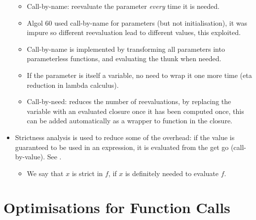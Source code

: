 \begin{itemize}
\begin{itemize}
\item Call-by-name: reevaluate the parameter \emph{every} time it is needed.

\item Algol 60 used call-by-name for parameters (but not initialisation), it
was impure so different reevaluation lead to different values, this exploited.

\item Call-by-name is implemented by transforming all parameters into
parameterless functions, and evaluating the thunk when needed.

\item If the parameter is itself a variable, no need to wrap it one more time
(eta reduction in lambda calculus).

\item Call-by-need: reduces the number of reevaluations, by replacing the
variable with an evaluated closure once it has been computed once, this can be
added automatically as a wrapper to function in the closure.
\end{itemize}

\item Strictness analysis is used to reduce some of the overhead: if the value
is guaranteed to be used in an expression, it is evaluated from the get go
(call-by-value). See .


\begin{itemize}

\item We say that $x$ is strict in $f$, if $x$ is definitely needed to evaluate
$f$.

\end{itemize}

\end{itemize}

\section{Optimisations for Function Calls}

